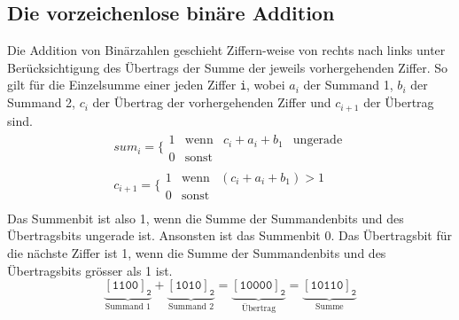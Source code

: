 \subsection{Die vorzeichenlose binäre Addition}
Die Addition von Binärzahlen geschieht Ziffern-weise von rechts nach links unter Berücksichtigung des Übertrags der Summe der jeweils vorhergehenden Ziffer. So gilt für die Einzelsumme einer jeden Ziffer \texttt{i}, wobei $a_i$ der Summand 1, $b_i$ der Summand 2, $c_i$ der Übertrag der vorhergehenden Ziffer und $c_{i+1}$ der Übertrag sind.
\begin{equation}
\boxed{
\begin{array}{lll}
sum_i=\Bigg\{\begin{matrix}1&\text{wenn}&c_i+a_i+b_1&\text{ungerade}\\0&\text{sonst}\end{matrix}\\
c_{i+1}=\Bigg\{\begin{matrix}1&\text{wenn}&(c_i+a_i+b_1)>1&\\0&\text{sonst}\end{matrix}\\
\end{array}
}
\end{equation}
Das Summenbit ist also 1, wenn die Summe der Summandenbits und des Übertragsbits ungerade ist. Ansonsten ist das Summenbit 0. Das Übertragsbit für die nächste Ziffer ist 1, wenn die Summe der Summandenbits und des Übertragsbits grösser als 1 ist.
\begin{equation}
\underbrace{[\texttt{1100}]_{\texttt{2}}}_{\text{Summand 1}}+\underbrace{[\texttt{1010}]_{\texttt{2}}}_{\text{Summand 2}}=\underbrace{[\texttt{10000}]_{\texttt{2}}}_{\text{Übertrag}}=\underbrace{[\texttt{10110}]_{\texttt{2}}}_{\text{Summe}}
\end{equation}
